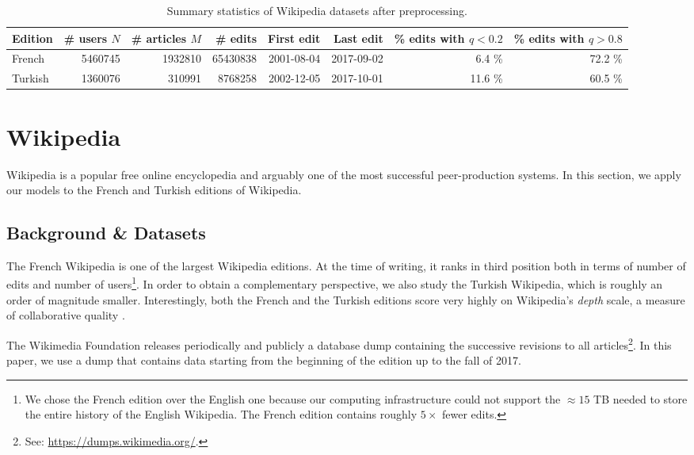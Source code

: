 \begin{table*}
	\caption{Summary statistics of Wikipedia datasets after preprocessing.}
	\label{tab:wikidata}
	\begin{tabular}{lrrrrrrr}
		\toprule
		Edition & \# users $N$  & \# articles $M$ & \# edits       & First edit & Last edit  & \% edits with $q < 0.2$ & \% edits with $q > 0.8$ \\
		\midrule
		French  & \num{5460745} & \num{1932810}   & \num{65430838} & 2001-08-04 & 2017-09-02 & \num{6.4} \%            & \num{72.2} \%           \\
		Turkish & \num{1360076} & \num{310991}    & \num{8768258}  & 2002-12-05 & 2017-10-01 & \num{11.6} \%           & \num{60.5} \%           \\
		\bottomrule
	\end{tabular}
\end{table*}

\section{Wikipedia}
\label{sec:wikipedia}

Wikipedia is a popular free online encyclopedia and arguably one of the most successful peer-production systems.
In this section, we apply our models to the French and Turkish editions of Wikipedia.

\subsection{Background \& Datasets}

The French Wikipedia is one of the largest Wikipedia editions.
At the time of writing, it ranks in third position both in terms of number of edits and number of users\footnote{%
	We chose the French edition over the English one because our computing infrastructure could not support the $\approx15$ TB needed to store the entire history of the English Wikipedia.
	The French edition contains roughly $5\times$ fewer edits.
}.
In order to obtain a complementary perspective, we also study the Turkish Wikipedia, which is roughly an order of magnitude smaller.
Interestingly, both the French and the Turkish editions score very highly on Wikipedia's \emph{depth} scale, a measure of collaborative quality \citep{wikimedia2017depth}.

The Wikimedia Foundation releases periodically and publicly a database dump containing the successive revisions to all articles\footnote{%
	See: \url{https://dumps.wikimedia.org/}.}.
In this paper, we use a dump that contains data starting from the beginning of the edition up to the fall of 2017.

